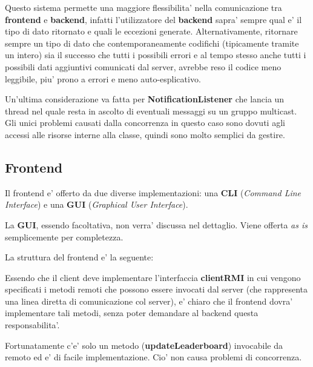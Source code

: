 Questo sistema permette una maggiore flessibilita' nella comunicazione tra \textbf{frontend} e \textbf{backend}, infatti l'utilizzatore del \textbf{backend} sapra' sempre qual e' il tipo di dato ritornato e quali le eccezioni generate. Alternativamente, ritornare sempre un tipo di dato che contemporaneamente codifichi (tipicamente tramite un intero) sia il successo che tutti i possibili errori e al tempo stesso anche tutti i possibili dati aggiuntivi comunicati dal server, avrebbe reso il codice meno leggibile, piu' prono a errori e meno auto-esplicativo.

Un'ultima considerazione va fatta per \textbf{NotificationListener} che lancia un thread nel quale resta in ascolto di eventuali messaggi su un gruppo multicast. Gli unici problemi causati dalla concorrenza in questo caso sono dovuti agli accessi alle risorse interne alla classe, quindi sono molto semplici da gestire.

\subsection{Frontend}

Il frontend e' offerto da due diverse implementazioni: una \textbf{CLI} (\emph{Command Line Interface}) e una \textbf{GUI} (\emph{Graphical User Interface}).

La \textbf{GUI}, essendo facoltativa, non verra' discussa nel dettaglio. Viene offerta \emph{as is} semplicemente per completezza.

La struttura del frontend e' la seguente:
\bigskip

\bigskip

Essendo che il client deve implementare l'interfaccia \textbf{clientRMI} in cui vengono specificati i metodi remoti che possono essere invocati dal server (che rappresenta una linea diretta di comunicazione col server), e' chiaro che il frontend dovra' implementare tali metodi, senza poter demandare al backend questa responsabilita'.

Fortunatamente c'e' solo un metodo (\textbf{updateLeaderboard}) invocabile da remoto ed e' di facile implementazione. Cio' non causa problemi di concorrenza.

